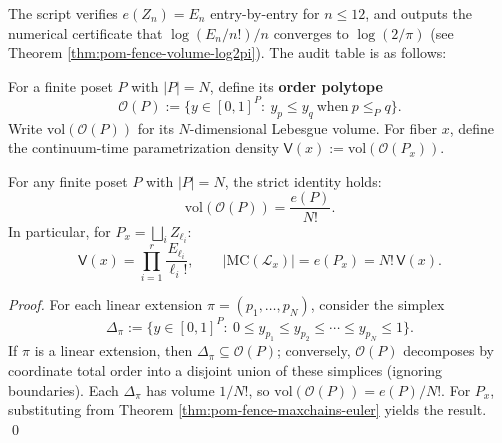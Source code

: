 \begin{remark}[Finite window auditing: \(e(Z_n)=E_n\) and volume constant]\label{rem:pom-fence-euler-volume-audit}
The script verifies \(e(Z_n)=E_n\) entry-by-entry for \(n\le 12\), and outputs the numerical certificate that \(\log(E_n/n!)/n\) converges to \(\log(2/\pi)\) (see Theorem \ref{thm:pom-fence-volume-log2pi}).
The audit table is as follows:

\end{remark}

\begin{definition}\label{def:pom-order-polytope-volume}
For a finite poset \(P\) with \(|P|=N\), define its \textbf{order polytope}
\[
\mathcal O(P):=\{y\in[0,1]^P:\ y_p\le y_q\ \text{when}\ p\le_P q\}.
\]
Write \(\mathrm{vol}(\mathcal O(P))\) for its \(N\)-dimensional Lebesgue volume.
For fiber \(x\), define the continuum-time parametrization density
\(
\mathsf V(x):=\mathrm{vol}(\mathcal O(P_x)).
\)
\end{definition}

\begin{theorem}[Discrete--continuum identity: linear extension count = normalized volume]\label{thm:pom-order-polytope-volume-linext}
For any finite poset \(P\) with \(|P|=N\), the strict identity holds:
\[
\mathrm{vol}(\mathcal O(P))=\frac{e(P)}{N!}.
\]
In particular, for \(P_x=\bigsqcup_i Z_{\ell_i}\):
\[
\mathsf V(x)=\prod_{i=1}^r \frac{E_{\ell_i}}{\ell_i!},
\qquad
|\mathrm{MC}(\mathcal L_x)|=e(P_x)=N!\,\mathsf V(x).
\]
\end{theorem}
\begin{proof}
For each linear extension \(\pi=(p_1,\dots,p_N)\), consider the simplex
\[
\Delta_\pi:=\{y\in[0,1]^P:\ 0\le y_{p_1}\le y_{p_2}\le\cdots\le y_{p_N}\le 1\}.
\]
If \(\pi\) is a linear extension, then \(\Delta_\pi\subseteq \mathcal O(P)\);
conversely, \(\mathcal O(P)\) decomposes by coordinate total order into a disjoint union of these simplices (ignoring boundaries).
Each \(\Delta_\pi\) has volume \(1/N!\), so \(\mathrm{vol}(\mathcal O(P))=e(P)/N!\).
For \(P_x\), substituting from Theorem \ref{thm:pom-fence-maxchains-euler} yields the result. \qed
\end{proof}


